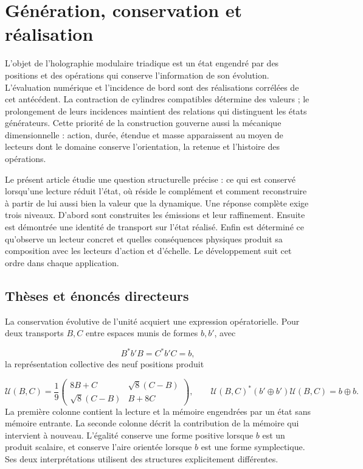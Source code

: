 \section{Génération, conservation et réalisation}
\label{nuclear:introduccion}
L’objet de l’holographie modulaire triadique est un état engendré par des positions et des opérations qui conserve l’information de son évolution. L’évaluation numérique et l’incidence de bord sont des réalisations corrélées de cet antécédent. La contraction de cylindres compatibles détermine des valeurs ; le prolongement de leurs incidences maintient des relations qui distinguent les états générateurs. Cette priorité de la construction gouverne aussi la mécanique dimensionnelle : action, durée, étendue et masse apparaissent au moyen de lecteurs dont le domaine conserve l’orientation, la retenue et l’histoire des opérations.

Le présent article étudie une question structurelle précise : ce qui est conservé lorsqu’une lecture réduit l’état, où réside le complément et comment reconstruire à partir de lui aussi bien la valeur que la dynamique. Une réponse complète exige trois niveaux. D’abord sont construites les émissions et leur raffinement. Ensuite est démontrée une identité de transport sur l’état réalisé. Enfin est déterminé ce qu’observe un lecteur concret et quelles conséquences physiques produit sa composition avec les lecteurs d’action et d’échelle. Le développement suit cet ordre dans chaque application.

\subsection{Thèses et énoncés directeurs
}
La conservation évolutive de l’unité acquiert une expression opératorielle. Pour deux transports \(B,C\) entre espaces munis de formes \(b,b'\), avec

\[
B^{*}b'B=C^{*}b'C=b,
\]
la représentation collective des neuf positions produit

\begin{equation}
\mathcal U(B,C)=\frac19
\begin{pmatrix}8B+C&\sqrt8(C-B)\\ \sqrt8(C-B)&B+8C\end{pmatrix},
\qquad
\mathcal U(B,C)^*(b'\oplus b')\mathcal U(B,C)=b\oplus b.
\label{nuclear:eq:rectora}
\end{equation}
La première colonne contient la lecture et la mémoire engendrées par un état sans mémoire entrante. La seconde colonne décrit la contribution de la mémoire qui intervient à nouveau. L’égalité conserve une forme positive lorsque \(b\) est un produit scalaire, et conserve l’aire orientée lorsque \(b\) est une forme symplectique. Ses deux interprétations utilisent des structures explicitement différentes.


